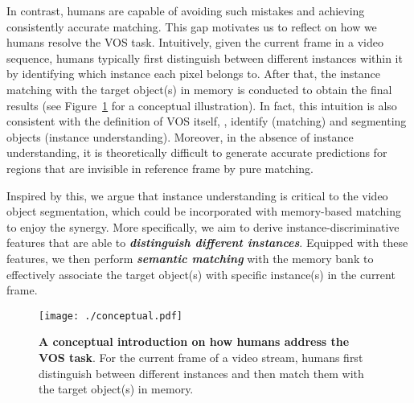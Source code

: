 \documentclass[10pt,twocolumn,letterpaper]{article}
\begin{document}
In contrast, humans are capable of avoiding such mistakes and achieving consistently accurate matching. This gap motivates us to reflect on how we humans resolve the VOS task. Intuitively, given the current frame in a video sequence, humans typically first distinguish between different instances within it by identifying which instance each pixel belongs to. After that, the instance matching with the target object(s) in memory is conducted to obtain the final results (see Figure~\ref{fig:conceptual} for a conceptual illustration).  In fact, this intuition is also consistent with the definition of VOS itself, \ie, identify (matching) and segmenting objects (instance understanding). Moreover, in the absence of instance understanding, it is theoretically difficult to generate accurate predictions for regions that are invisible in reference frame by pure matching.

Inspired by this, we argue that instance understanding is critical to the video object segmentation, which could be incorporated with memory-based matching to enjoy the synergy. More specifically, we aim to derive instance-discriminative features that are able to \textbf{\textit{distinguish different instances}}. Equipped with these features, we then perform \textbf{\textit{semantic matching}} with the memory bank to effectively associate the target object(s) with specific instance(s) in the current frame.

\begin{figure}[t]
  \centering
   \texttt{[image: ./conceptual.pdf]}
   \vspace{-0.25in}
   \caption{\textbf{A conceptual introduction on how humans address the VOS task}. For the current frame of a video stream, humans first distinguish between different instances and then match them with the target object(s) in memory. }
   \label{fig:conceptual}
\end{figure}
\end{document}
